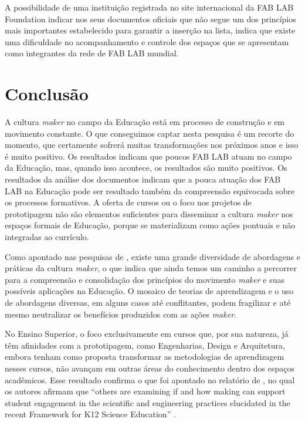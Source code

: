 \documentclass[portuguese]{textolivre}
\begin{document}
A possibilidade de uma instituição registrada no site internacional da FAB LAB Foundation indicar nos seus documentos oficiais que não segue um dos princípios mais importantes estabelecido para garantir a inserção na lista, indica que existe uma dificuldade no acompanhamento e controle dos espaços que se apresentam como integrantes da rede de FAB LAB mundial.


\section{Conclusão}\label{sec-idioma}
A cultura \textit{maker} no campo da Educação está em processo de construção e em movimento constante. O que conseguimos captar nesta pesquisa é um recorte do momento, que certamente sofrerá muitas transformações nos próximos anos e isso é muito positivo. Os resultados indicam que poucos FAB LAB atuam no campo da Educação, mas, quando isso acontece, os resultados são muito positivos. Os resultados da análise dos documentos indicam que a pouca atuação dos FAB LAB na Educação pode ser resultado também da compreensão equivocada sobre os processos formativos. A oferta de cursos ou o foco nos projetos de prototipagem não são elementos suficientes para disseminar a cultura \textit{maker} nos espaços formais de Educação, porque se materializam como ações pontuais e não integradas ao currículo.

Como apontado nas pesquisas de \textcite{blikstein_educacao_2020,soster_educacao_2020}, existe uma grande diversidade de abordagens e práticas da cultura \textit{maker}, o que indica que ainda temos um caminho a percorrer para a compreensão e consolidação dos princípios do movimento \textit{maker} e suas possíveis aplicações na Educação. O mosaico de teorias de aprendizagem e o uso de abordagens diversas, em alguns casos até conflitantes, podem fragilizar e até mesmo neutralizar os benefícios produzidos com as ações \textit{maker}.

No Ensino Superior, o foco exclusivamente em cursos que, por sua natureza, já têm afinidades com a prototipagem, como Engenharias, Design e Arquitetura, embora tenham como proposta transformar as metodologias de aprendizagem nesses cursos, não avançam em outras áreas do conhecimento dentro dos espaços acadêmicos. Esse resultado confirma o que foi apontado no relatório de \textcite{vossoughi_making_2015}, no qual os autores afirmam que ``others are examining if and how making can support student engagement in the scientific and engineering practices elucidated in the recent Framework for K12 Science Education'' \textcite[p.~4]{vossoughi_making_2015}.
\end{document}
